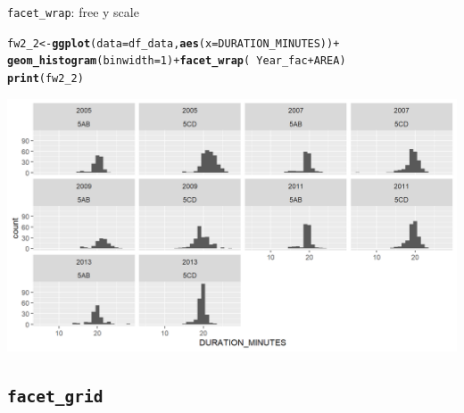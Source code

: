 \documentclass{beamer}\usepackage[]{graphicx}\usepackage[]{color}
\makeatletter
\newcommand{\hlnum}[1]{\textcolor[rgb]{0.686,0.059,0.569}{#1}}%
\newcommand{\hlopt}[1]{\textcolor[rgb]{0,0,0}{#1}}%
\newcommand{\hlstd}[1]{\textcolor[rgb]{0.345,0.345,0.345}{#1}}%
\newcommand{\hlkwb}[1]{\textcolor[rgb]{0.69,0.353,0.396}{#1}}%
\newcommand{\hlkwc}[1]{\textcolor[rgb]{0.333,0.667,0.333}{#1}}%
\newcommand{\hlkwd}[1]{\textcolor[rgb]{0.737,0.353,0.396}{\textbf{#1}}}%
\newenvironment{kframe}{%
 \def\at@end@of@kframe{}%
 \ifinner\ifhmode%
  \def\at@end@of@kframe{\end{minipage}}%
  \begin{minipage}{\columnwidth}%
 \fi\fi%
 \def\FrameCommand##1{\hskip\@totalleftmargin \hskip-\fboxsep
 \colorbox{shadecolor}{##1}\hskip-\fboxsep
     \hskip-\linewidth \hskip-\@totalleftmargin \hskip\columnwidth}%
 \MakeFramed {\advance\hsize-\width
   \@totalleftmargin\z@ \linewidth\hsize
   \@setminipage}}%
 {\par\unskip\endMakeFramed%
 \at@end@of@kframe}
\newenvironment{knitrout}{}{} %
\makeatother
\begin{document}
\begin{frame}[fragile]{\lstinline{facet_wrap}: free y scale}
\begin{knitrout}\footnotesize
{}\color{fgcolor}\begin{kframe}
\begin{alltt}
\hlstd{fw2_2} \hlkwb{<-} \hlkwd{ggplot}\hlstd{(}\hlkwc{data}\hlstd{=df_data,} \hlkwd{aes}\hlstd{(}\hlkwc{x}\hlstd{=DURATION_MINUTES))} \hlopt{+}
  \hlkwd{geom_histogram}\hlstd{(}\hlkwc{binwidth}\hlstd{=}\hlnum{1}\hlstd{)} \hlopt{+} \hlkwd{facet_wrap}\hlstd{(} \hlopt{~} \hlstd{Year_fac} \hlopt{+} \hlstd{AREA)}
\hlkwd{print}\hlstd{(fw2_2)}
\end{alltt}
\end{kframe}

{\centering \includegraphics[width=.9\linewidth]{figure/facet_wrap_6-1} 

}



\end{knitrout}
\end{frame}

\subsection{\lstinline{facet_grid}}
\end{document}
